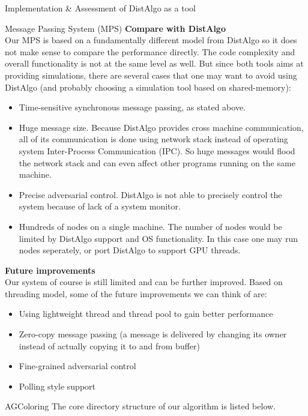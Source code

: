 \documentclass[12pt]{article}  %
\begin{document}
\begin{section}{Implementation \& Assessment of DistAlgo as a tool}
\begin{subsection}{Message Passing System (MPS)}
\noindent
\textbf{Compare with DistAlgo}\\
Our MPS is based on a fundamentally different model from DistAlgo so it does not make sense to compare the performance directly.
The code complexity and overall functionality is not at the same level as well. But since both tools aims at providing simulations, 
there are several cases that one may want to avoid using DistAlgo (and probably choosing a simulation tool based on shared-memory):
\begin{itemize}
	\item{Time-sensitive synchronous message passing, as stated above.}
	\item{Huge message size. Because DistAlgo provides cross machine communication, 
	all of its communication is done using network stack instead of operating system Inter-Process Communication (IPC). 
	So huge messages would flood the network stack and can even affect other programs running on the same machine.}
	\item{Precise adversarial control. DistAlgo is not able to precisely control the system because of lack of a system monitor.}
	\item{Hundreds of nodes on a single machine. The number of nodes would be limited by DistAlgo support and OS functionality.
	In this case one may run nodes seperately, or port DistAlgo to support GPU threads.}
\end{itemize}

\noindent
\textbf{Future improvements}\\
Our system of course is still limited and can be further improved. Based on threading model, some of the future improvements 
we can think of are:
\begin{itemize}
	\item{Using lightweight thread and thread pool to gain better performance}
	\item{Zero-copy message passing (a message is delivered by changing its owner instead of 
	actually copying it to and from buffer)}
	\item{Fine-grained adversarial control}
	\item{Polling style support}
\end{itemize}
\end{subsection}

\begin{subsection}{AGColoring}
The core directory structure of our algorithm is listed below.


\end{subsection}
\end{section}
\end{document}
